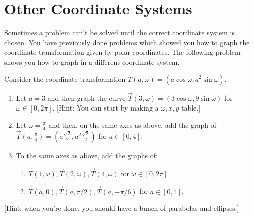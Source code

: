 \section{Other Coordinate Systems}
Sometimes a problem can't be solved until the correct coordinate system is chosen. You have previously done problems which showed you how to graph the coordinate transformation given by polar coordinates.  The following problem shows you how to graph in a different coordinate system.

\begin{problem}\label{prob:transform1}
Consider the coordinate transformation $T(a,\omega)=(a\cos\omega,a^2\sin \omega)$.
\begin{enumerate}
\item{}%
 Let $a=3$ and then graph the curve $\vec T(3,\omega)=(3\cos\omega,9\sin\omega)$ for $\omega\in[0,2\pi]$. [Hint: You can start by making a $\omega,x,y$ table.]
\item{}%
 Let $\omega=\frac{\pi}{4}$ and then, on the same axes as above, add the graph of 
$\vec T\left(a,\frac{\pi}{4}\right)=\left(a\frac{\sqrt 2}{2},a^2 \frac{\sqrt 2}{2}\right)$ for $a\in[0,4]$.
\item{}To the same axes as above, add the graphs of:
\begin{enumerate} 
	\item $\vec T(1,\omega), \vec T(2,\omega), \vec T(4,\omega)$  for $\omega\in[0,2\pi]$
	\item $\vec T(a,0), \vec T(a,\pi/2), \vec T(a,-\pi/6)$ for $a\in[0,4]$. 
\end{enumerate}
\end{enumerate}
[Hint: when you're done, you should have a bunch of parabolas and ellipses.]
\end{problem}

